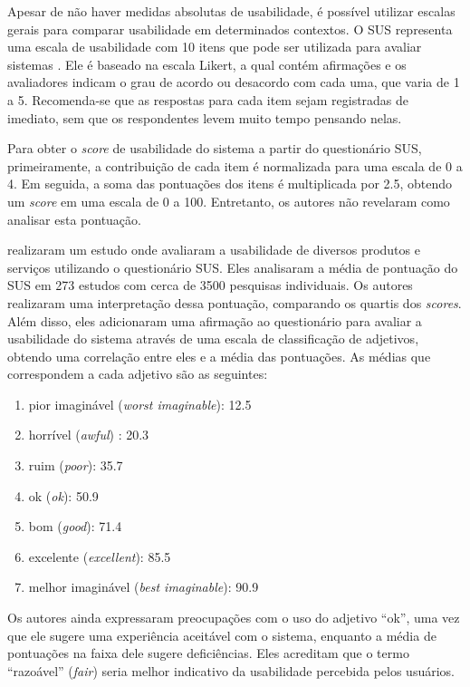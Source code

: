 Apesar de não haver medidas absolutas de usabilidade, é possível utilizar escalas gerais para comparar usabilidade em determinados contextos. O SUS representa uma escala de usabilidade com 10 itens que pode ser utilizada para avaliar sistemas \citep{brooke1996sus}. Ele é baseado na escala Likert, a qual contém afirmações e os avaliadores indicam o grau de acordo ou desacordo com cada uma, que varia de 1 a 5. Recomenda-se que as respostas para cada item sejam registradas de imediato, sem que os respondentes levem muito tempo pensando nelas.

Para obter o \textit{score} de usabilidade do sistema a partir do questionário SUS, primeiramente, a contribuição de cada item é normalizada para uma escala de 0 a 4. Em seguida, a soma das pontuações dos itens é multiplicada por 2.5, obtendo um \textit{score} em uma escala de 0 a 100. Entretanto, os autores não revelaram como analisar esta pontuação.

\citet{bangor2008empirical, bangor2009determining} realizaram um estudo onde avaliaram a usabilidade de diversos produtos e serviços utilizando o questionário SUS. Eles analisaram a média de pontuação do SUS em 273 estudos com cerca de 3500 pesquisas individuais. Os autores realizaram uma interpretação dessa pontuação, comparando os quartis dos \textit{scores}. Além disso, eles adicionaram uma afirmação ao questionário para avaliar a usabilidade do sistema através de uma escala de classificação de adjetivos, obtendo uma correlação entre eles e a média das pontuações. As médias que correspondem a cada adjetivo são as seguintes:

\begin{enumerate}
    \item pior imaginável (\textit{worst imaginable}): 12.5
    \item horrível (\textit{awful}) : 20.3
    \item ruim (\textit{poor}): 35.7
    \item ok (\textit{ok}): 50.9
    \item bom (\textit{good}): 71.4
    \item excelente (\textit{excellent}): 85.5
    \item melhor imaginável (\textit{best imaginable}): 90.9
\end{enumerate}

Os autores ainda expressaram preocupações com o uso do adjetivo \enquote{ok}, uma vez que ele sugere uma experiência aceitável com o sistema, enquanto a média de pontuações na faixa dele sugere deficiências. Eles acreditam que o termo \enquote{razoável} (\textit{fair}) seria melhor indicativo da usabilidade percebida pelos usuários.


